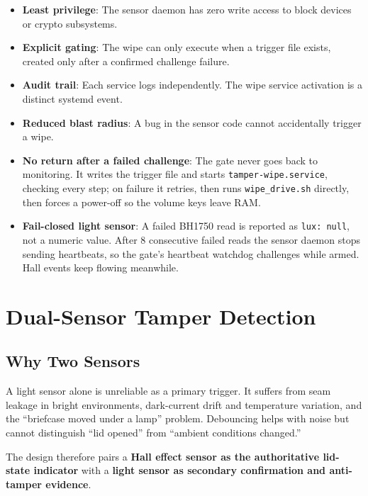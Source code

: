 \documentclass[11pt,letterpaper]{article}
\begin{document}
\begin{itemize}
  \item \textbf{Least privilege}: The sensor daemon has zero write access to block devices or crypto subsystems.
  \item \textbf{Explicit gating}: The wipe can only execute when a trigger file exists, created only after a confirmed challenge failure.
  \item \textbf{Audit trail}: Each service logs independently. The wipe service activation is a distinct systemd event.
  \item \textbf{Reduced blast radius}: A bug in the sensor code cannot accidentally trigger a wipe.
  \item \textbf{No return after a failed challenge}: The gate never goes back to monitoring. It writes the trigger file and starts \texttt{tamper-wipe.service}, checking every step; on failure it retries, then runs \texttt{wipe\_drive.sh} directly, then forces a power-off so the volume keys leave RAM.
  \item \textbf{Fail-closed light sensor}: A failed BH1750 read is reported as \texttt{lux: null}, not a numeric value. After 8 consecutive failed reads the sensor daemon stops sending heartbeats, so the gate's heartbeat watchdog challenges while armed. Hall events keep flowing meanwhile.
\end{itemize}


\section{Dual-Sensor Tamper Detection}

\subsection{Why Two Sensors}

A light sensor alone is unreliable as a primary trigger. It suffers from seam leakage in bright environments, dark-current drift and temperature variation, and the ``briefcase moved under a lamp'' problem. Debouncing helps with noise but cannot distinguish ``lid opened'' from ``ambient conditions changed.''

The design therefore pairs a \textbf{Hall effect sensor as the authoritative lid-state indicator} with a \textbf{light sensor as secondary confirmation and anti-tamper evidence}.
\end{document}
